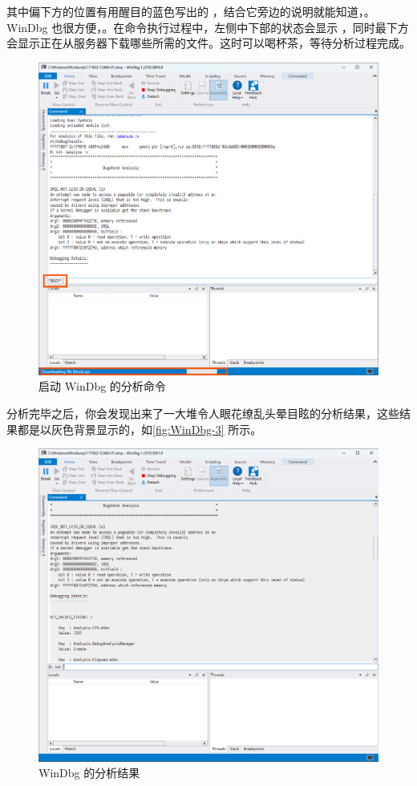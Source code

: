 其中偏下方的位置有用醒目的蓝色写出的 ，结合它旁边的说明就能知道，。WinDbg 也很方便，。在命令执行过程中，左侧中下部的状态会显示 ，同时最下方会显示正在从服务器下载哪些所需的文件。这时可以喝杯茶，等待分析过程完成。

\begin{figure}[htb!]
  \centering
  \includegraphics[width=.75\textwidth]{assets/advanced/WinDbg-2.png}
  \caption{启动 WinDbg 的分析命令}
  \label{fig:WinDbg-2}
\end{figure}

分析完毕之后，你会发现出来了一大堆令人眼花缭乱头晕目眩的分析结果，这些结果都是以灰色背景显示的，如\autoref{fig:WinDbg-3} 所示。

\begin{figure}[htb!]
  \centering
  \includegraphics[width=.75\textwidth]{assets/advanced/WinDbg-3.png}
  \caption{WinDbg 的分析结果}
  \label{fig:WinDbg-3}
\end{figure}

